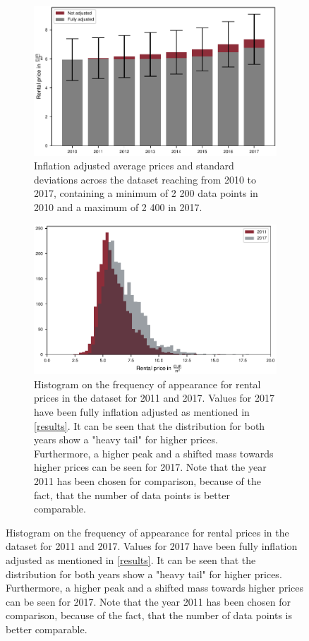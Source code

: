 \documentclass{article}
\begin{document}
		\begin{figure}
			\begin{subfigure}[t]{0.5\textwidth}
			\includegraphics[width=1\textwidth]{../fig/figures/barchart_rental_prices.pdf}
			\caption{Inflation adjusted average prices and standard deviations across the dataset reaching from 2010 to 2017, containing a minimum of 2 200 data points in 2010 and a maximum of 2 400 in 2017.}
			\label{barchart_rental_prices}		
			\end{subfigure}
	\hspace{0.2cm}
			\begin{subfigure}[t]{0.5\textwidth}
		\includegraphics[width=1\textwidth]{../fig/figures/Histogram_rental_prices.pdf}
		\caption{Histogram on the frequency of appearance for rental prices in the dataset for 2011 and 2017. Values for 2017 have been fully inflation adjusted as mentioned in \cref{results}. It can be seen that the distribution for both years show a "heavy tail" for higher prices. Furthermore, a higher peak and a shifted mass towards higher prices can be seen for 2017. Note that the year 2011 has been chosen for comparison, because of the fact, that the number of data points is better comparable.}
		\label{histogram_rental_prices}
			\end{subfigure}
		\end{figure}
\end{document}
